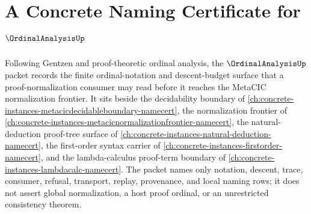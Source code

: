 \chapter{A Concrete Naming Certificate for $\OrdinalAnalysisUp$}
\label{ch:concrete-instances-ordinal-analysis-namecert}

Following Gentzen and proof-theoretic ordinal analysis, the $\OrdinalAnalysisUp$ packet records the finite ordinal-notation and descent-budget surface that a proof-normalization consumer may read before it reaches the MetaCIC normalization frontier. It sits beside the decidability boundary of \autoref{ch:concrete-instances-metacicdecidableboundary-namecert}, the normalization frontier of \autoref{ch:concrete-instances-metacicnormalizationfrontier-namecert}, the natural-deduction proof-tree surface of \autoref{ch:concrete-instances-natural-deduction-namecert}, the first-order syntax carrier of \autoref{ch:concrete-instances-firstorder-namecert}, and the lambda-calculus proof-term boundary of \autoref{ch:concrete-instances-lambdacalc-namecert}. The packet names only notation, descent, trace, consumer, refusal, transport, replay, provenance, and local naming rows; it does not assert global normalization, a host proof ordinal, or an unrestricted consistency theorem.

